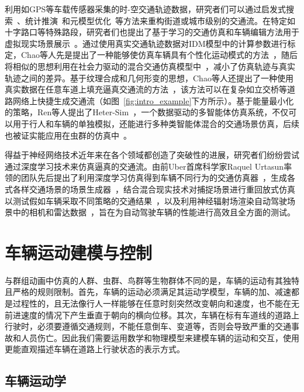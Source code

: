 利用如GPS等车载传感器采集的时-空交通轨迹数据，研究者们可以通过启发式搜索~\cite{sewall2010virtualized}、统计推演~\cite{wilkie2013flow}和元模型优化~\cite{li2017city}等方法来重构街道或城市级别的交通流。在特定如十字路口等特殊路段，研究者们也提出了基于学习的交通仿真和车辆编辑方法用于虚拟现实场景展示~\cite{bi2019deep}。通过使用真实交通轨迹数据对IDM模型中的计算参数进行标定，Chao等人先是提出了一种能够使仿真车辆具有个性化运动模式的方法~\cite{chao2013video}，随后将相似的思想利用在社会力驱动的混合交通仿真模型中~\cite{chao2021calibrated}，减小了仿真轨迹与真实轨迹之间的差异。基于纹理合成和几何形变的思想，Chao等人还提出了一种使用真实数据在任意车道上填充逼真交通流的方法~\cite{chao2017realistic}，该方法可以在复杂如立交桥等道路网络上快捷生成交通流（如图~\ref{fig:intro_example}下方所示）。基于能量最小化的策略，Ren等人提出了Heter-Sim~\cite{ren2019heter}，一个数据驱动的多智能体仿真系统，不仅可以用于行人和车辆的单独模拟，还能进行多种类智能体混合的交通场景仿真，后续也被证实能应用在虫群的仿真中~\cite{xiang2020fastswarm}。

得益于神经网络技术近年来在各个领域都创造了突破性的进展，研究者们纷纷尝试通过深度学习技术来仿真逼真的交通流。由前Uber首席科学家Raquel Urtasun率领的团队先后提出了利用深度学习仿真得到车辆不同行为的交通仿真器~\cite{suo2021trafficsim}，生成各式各样交通场景的场景生成器~\cite{tan2021scenegen}，结合混合现实技术对捕捉场景进行重回放式仿真以测试假如车辆采取不同策略的交通结果~\cite{suo2023mixsim}，以及利用神经辐射场渲染自动驾驶场景中的相机和雷达数据~\cite{yang2023unisim}，旨在为自动驾驶车辆的性能进行高效且全方面的测试。



\section{车辆运动建模与控制}

与群组动画中仿真的人群、虫群、鸟群等生物群体不同的是，车辆的运动有其独特且严格的规则限制。首先，车辆的运动必须满足其运动学模型，车辆的加、减速都是过程性的，且无法像行人一样能够在任意时刻突然改变朝向和速度，也不能在无前进速度的情况下产生垂直于朝向的横向位移。其次，车辆在标有车道线的道路上行驶时，必须要遵循交通规则，不能任意倒车、变道等，否则会导致严重的交通事故和人员伤亡。因此我们需要运用数学和物理模型来建模车辆的运动和交互，使用更能直观描述车辆在道路上行驶状态的表示方式。


\subsection{车辆运动学}

